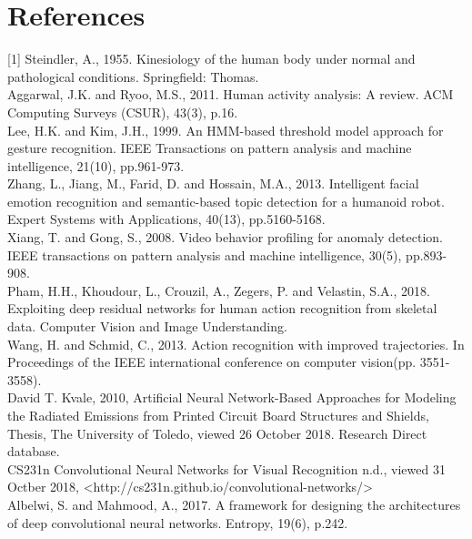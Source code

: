 \chapter{References}
\printbibliography[heading=bibintoc]

[1] Steindler, A., 1955. Kinesiology of the human body under normal and pathological conditions. Springfield: Thomas.\\
\newline
[2] Aggarwal, J.K. and Ryoo, M.S., 2011. Human activity analysis: A review. ACM Computing Surveys (CSUR), 43(3), p.16.\\
[3] Lee, H.K. and Kim, J.H., 1999. An HMM-based threshold model approach for gesture recognition. IEEE Transactions on pattern analysis and machine intelligence, 21(10), pp.961-973.\\
\newline
[4] Zhang, L., Jiang, M., Farid, D. and Hossain, M.A., 2013. Intelligent facial emotion recognition and semantic-based topic detection for a humanoid robot. Expert Systems with Applications, 40(13), pp.5160-5168.\\
\newline
[5] Xiang, T. and Gong, S., 2008. Video behavior profiling for anomaly detection. IEEE transactions on pattern analysis and machine intelligence, 30(5), pp.893-908.\\
\newline
[6] Pham, H.H., Khoudour, L., Crouzil, A., Zegers, P. and Velastin, S.A., 2018. Exploiting deep residual networks for human action recognition from skeletal data. Computer Vision and Image Understanding.\\
\newline
[7] Wang, H. and Schmid, C., 2013. Action recognition with improved trajectories. In Proceedings of the IEEE international conference on computer vision(pp. 3551-3558).\\
\newline
[8] David T. Kvale, 2010, Artificial Neural Network-Based Approaches for Modeling the Radiated Emissions from Printed Circuit Board Structures and Shields, Thesis, The University of Toledo, viewed 26 October 2018. Research Direct database.\\
\newline
[9] CS231n Convolutional Neural Networks for Visual Recognition n.d., viewed 31 Octber 2018, <http://cs231n.github.io/convolutional-networks/>\\
\newline
[10] Albelwi, S. and Mahmood, A., 2017. A framework for designing the architectures of deep convolutional neural networks. Entropy, 19(6), p.242.\\
